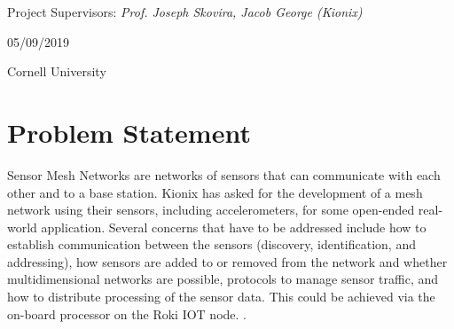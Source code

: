 \documentclass[11pt, a4paper]{article}
\begin{document}
\begin{titlepage}
		\vspace{2\baselineskip} %
	
	{\large Project Supervisors: \textit{Prof. Joseph Skovira, Jacob George (Kionix) }} %
	
	\vspace{0.5\baselineskip} %
	

	
	\vfill %
	
	
	
	\vspace{0.3\baselineskip} %
	
	05/09/2019 %
	
	{\large Cornell University} %
	
\end{titlepage}
	
	

\section{Problem Statement}
Sensor Mesh Networks are networks of sensors that can communicate with each other and to a base
station. Kionix has asked for the development of a mesh network using their sensors, including
accelerometers, for some open-ended real-world application.
Several concerns that have to be addressed include how to establish communication between the
sensors (discovery, identification, and addressing), how sensors are added to or removed from the
network and whether multidimensional networks are possible, protocols to manage sensor traffic, and
how to distribute processing of the sensor data. This could be achieved via the on-board processor on the Roki IOT node. \cite{mesh}.
\end{document}
